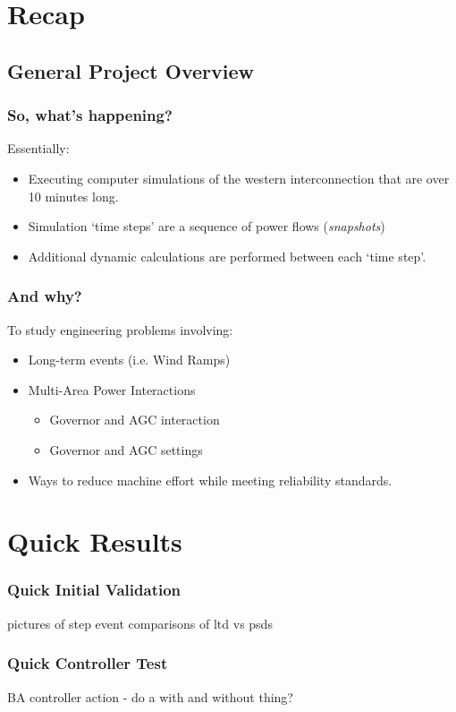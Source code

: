 \documentclass[14pt, unknownkeysallowed]{beamer}
\begin{document}
\section{Recap}
\subsection{General Project Overview}
\begin{frame}
\frametitle{So, what's happening?}
Essentially:
\begin{itemize}
	\item Executing computer simulations of the western interconnection that are  over 10 minutes long.
	\item Simulation `time steps' are a sequence of power flows (\emph{snapshots})
	\item Additional dynamic calculations are performed between each `time step'.
\end{itemize}

\end{frame}
\begin{frame}
\frametitle{And why?}
To study engineering problems involving:
\begin{itemize}
	\item Long-term events (i.e. Wind Ramps)
	\item Multi-Area Power Interactions
	\begin{itemize}
		\item Governor and AGC interaction
		\item Governor and AGC settings		
	\end{itemize}
	\item Ways to reduce machine effort while meeting reliability standards.
\end{itemize}
\end{frame}
\section{Quick Results}
\begin{frame}
\frametitle{Quick Initial Validation}
pictures of step event comparisons of ltd vs psds
\end{frame}
\begin{frame}
\frametitle{Quick Controller Test}
BA controller action - do a with and without thing?
\end{frame}
\end{document}
